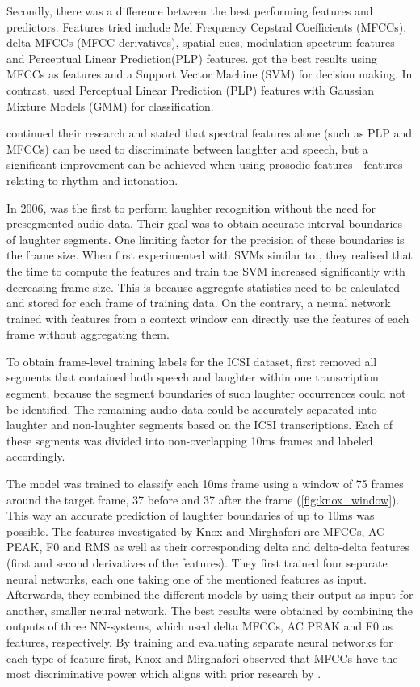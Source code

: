 \documentclass[bsc,frontabs,parskip,deptreport]{infthesis}
\begin{document}
Secondly, there was a difference between the best performing features and predictors.  
Features tried include Mel Frequency Cepstral Coefficients (MFCCs), delta MFCCs (MFCC derivatives), spatial cues, modulation spectrum features and Perceptual Linear Prediction(PLP) features. 
\citet{kennedy2004laughter} got the best results using MFCCs as features and a Support Vector Machine (SVM) for decision making.
In contrast, \citet{truong2005automatic} used Perceptual Linear Prediction (PLP) features with Gaussian Mixture Models (GMM) for classification. 

\citet{truong2007automatic} continued their research and stated that spectral features alone (such as PLP and MFCCs) can be used to discriminate between laughter and speech, but a significant improvement can be achieved when using prosodic features - features relating to rhythm and intonation.

In 2006, \citet{knox2006automatic} was the first to perform laughter recognition without the need for presegmented audio data.  
Their goal was to obtain accurate interval boundaries of laughter segments.
One limiting factor for the precision of these boundaries is the frame size. 
When \citet{knox2006automatic} first experimented with SVMs similar to \citet{kennedy2004laughter}, they realised that the time to compute the features and train the SVM increased significantly with decreasing frame size. 
This is because aggregate statistics need to be calculated and stored for each frame of training data.  
On the contrary, a neural network trained with features from a context window can directly use the features of each frame without aggregating them.  

To obtain frame-level training labels for the ICSI dataset, \citet{knox2006automatic} first removed all segments that contained both speech and laughter within one transcription segment, because the segment boundaries of such laughter occurrences could not be identified. 
The remaining audio data could be accurately separated into laughter and non-laughter segments based on the ICSI transcriptions. Each of these segments was divided into non-overlapping 10ms frames and labeled accordingly.

The model was trained to classify each 10ms frame using a window of 75 frames around the target frame, 37 before and 37 after the frame (\autoref{fig:knox_window}).
This way an accurate prediction of laughter boundaries of up to 10ms was possible. 
The features investigated by Knox and Mirghafori are MFCCs, AC PEAK, F0 and RMS as well as their corresponding delta and delta-delta features (first and second derivatives of the features).
They first trained four separate neural networks, each one taking one of the mentioned features as input.
Afterwards, they combined the different models by using their output as input for another, smaller neural network.
The best results were obtained by combining the outputs of three NN-systems, which used delta MFCCs, AC PEAK and F0 as features, respectively.
By training and evaluating separate neural networks for each type of feature first, Knox and Mirghafori observed that MFCCs have the most discriminative power which aligns with prior research by \citet{kennedy2004laughter}.
\end{document}
